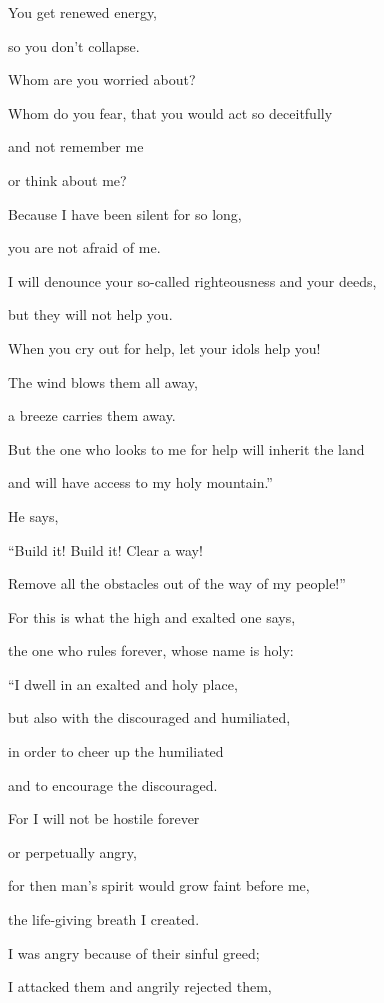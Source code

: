 {\par }{\Q You get renewed
energy,
\par }{\Q so
you don’t
collapse.
\par }{\Q {}Whom
are you worried
about?
\par }{\Q Whom do you fear,
that
you would act so deceitfully
\par }{\Q and not
remember
me
\par }{\Q or
think
about me?

\par }{\Q Because
I
have been silent
for so long,
\par }{\Q you are not
afraid of me.
\par }{\Q {}I
will denounce
your so-called righteousness
and your deeds,
\par }{\Q but they will not
help you.
\par }{\Q {}When you cry out
for help,
let your idols
help you!
\par }{\Q The wind
blows
them all
away,
\par }{\Q a breeze
carries
them away.
\par }{\Q But the one who looks
to me for help
will inherit
the land
\par }{\Q and will have access
to my holy
mountain.”
\par }{\Q {}He says,
\par }{\Q “Build it! Build it! Clear
a way!
\par }{\Q Remove
all the obstacles
out of the way
of my people!”
\par }{\Q {}For
this is what
the high
and exalted
one says,
\par }{\Q the one who rules
forever,
whose name
is holy:
\par }{\Q “I dwell
in an exalted
and holy
place,
\par }{\Q but also with
the discouraged
and humiliated,
\par }{\Q in order to cheer
up the humiliated
\par }{\Q and to encourage
the discouraged.
\par }{\Q {}For
I will not
be hostile forever
\par }{\Q or
perpetually
angry,
\par }{\Q for
then man’s spirit
would grow faint before
me,

\par }{\Q the life-giving
breath
I
created.
\par }{\Q {}I was
angry because
of their sinful
greed;
\par }{\Q I attacked
them and angrily rejected
them,

}
